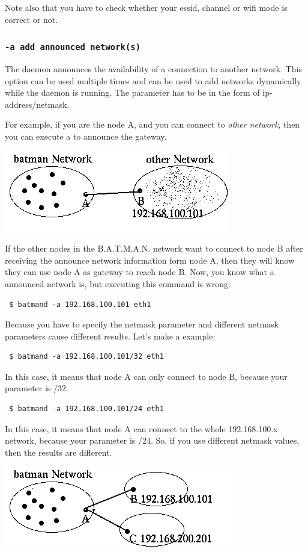 \documentclass[
	12pt,
	a4paper,
	twoside,
	english,
	headsepline,
	footnosepline,
	automark,
	normalheadings,
	openany,
	cleardoubleplain,
	abstracton,
	idxtotoc,
	liststotoc,
	bibtotoc,
 	BCOR8mm,
]{scrartcl}
\newcommand{\subsubsectionttt}[1]{\subsubsection{\texttt{#1}}}
\begin{document}
Note also that you have to check whether your essid, channel or wifi mode is
correct or not.

\subsubsectionttt{-a add announced network(s)}
The daemon announces the availability of a connection to another network. This
option can be used multiple times and can be used to add networks dynamically
while the daemon is running. The parameter has to be in the form of
ip-address/netmask.

For example, if you are the node A, and you can connect to \emph{other
network}, then you can execute a to announce the gateway.

\begin{center}
\includegraphics[scale=0.5]{announce_networks}
\end{center}

If the other nodes in the B.A.T.M.A.N. network want to connect to node B after
receiving the announce network information form node A, then they will know they
can use node A as gateway to reach node B. Now, you know what a announced
network is, but executing this command is wrong:
\begin{verbatim}
 $ batmand -a 192.168.100.101 eth1
\end{verbatim}

Because you have to specify the netmask parameter and different netmask
parameters cause different results. Let's make a example:
\begin{verbatim}
 $ batmand -a 192.168.100.101/32 eth1
\end{verbatim}
In this case, it means that node A can only connect to node B, because your
parameter is /32.

\begin{verbatim}
 $ batmand -a 192.168.100.101/24 eth1
\end{verbatim}
In this case, it means that node A can connect to the whole 192.168.100.x
network, because your parameter is /24. So, if you use different netmask values,
then the results are different.

\begin{center}
\includegraphics[scale=0.5]{multiple_announces}
\end{center}
\end{document}
